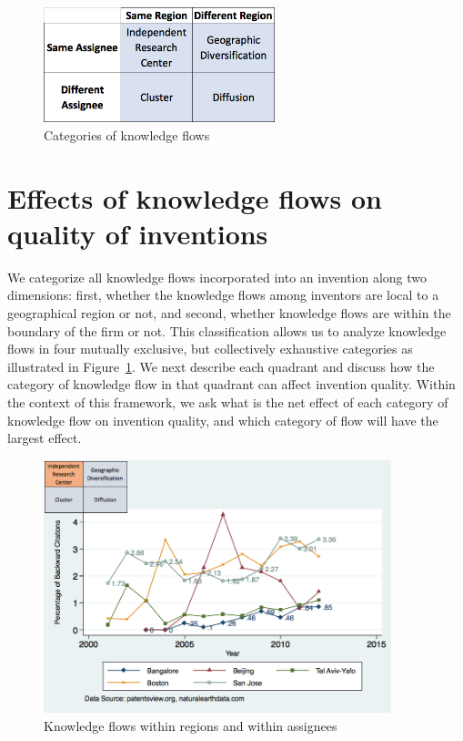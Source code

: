 \documentclass[parskip=full,10pt,letterpaper]{article}
\begin{document}
\begin{figure}[h]
\begin{centering}
  \includegraphics[width=0.6\textwidth]{2x2}
  \caption{Categories of knowledge flows}
  \label{fig:2x2}
\end{centering}
\end{figure}
\section*{Effects of knowledge flows on quality of inventions}
We categorize all knowledge flows incorporated into an invention along two dimensions:  first, whether the knowledge flows among inventors are local to a geographical region or not, and second, whether knowledge flows are within the boundary of the firm or not. This classification allows us to analyze knowledge flows in four mutually exclusive, but collectively exhaustive categories as illustrated in Figure~\ref{fig:2x2}. We next describe each quadrant and discuss how the category of knowledge flow in that quadrant can affect invention quality. Within the context of this framework, we ask what is the net effect of each category of knowledge flow on invention quality, and which category of flow will have the largest effect. \par

\begin{figure}[h!]
\begin{centering}
  \includegraphics[width=0.90\textwidth]{SMSSameRegionSameAssigneeFlows}
  \caption{Knowledge flows within regions and within assignees}
  \label{fig:SMSSameRegionSameAssigneeFlows}
\end{centering}
\end{figure}
\end{document}
